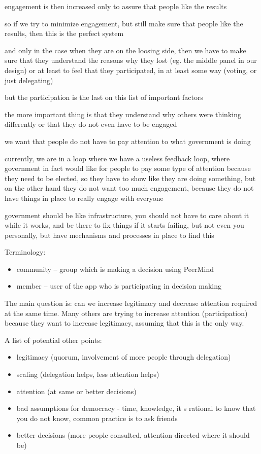\documentclass{sigchi}
\begin{document}
engagement is then increased only to assure that people like the results

so if we try to minimize engagement, but still make sure that people like the results, then this is the perfect system

and only in the case when they are on the loosing side, then we have to make sure that they understand the reasons why
they lost (eg. the middle panel in our design) or at least to feel that they participated, in at least some way
(voting, or just delegating)

but the participation is the last on this list of important factors

the more important thing is that they understand why others were thinking differently
or that they do not even have to be engaged

we want that people do not have to pay attention to what government is doing

currently, we are in a loop where we have a useless feedback loop, where government in fact would like for people
to pay some type of attention because they need to be elected, so they have to show like they are doing something,
but on the other hand they do not want too much engagement, because they do not have things in place to really
engage with everyone

government should be like infrastructure, you should not have to care about it while it works, and be there to fix
things if it starts failing, but not even you personally, but have mechanisms and processes in place to find this

Terminology:
\begin{itemize}
\item community -- group which is making a decision using PeerMind
\item member -- user of the app who is participating in decision making
\end{itemize}


The main question is: can we increase legitimacy and decrease attention required at the same time.
Many others are trying to increase attention (participation) because they want to increase legitimacy,
assuming that this is the only way.

A list of potential other points:
\begin{itemize}
\item legitimacy (quorum, involvement of more people through delegation)
\item scaling (delegation helps, less attention helps)
\item attention (at same or better decisions)
\item bad assumptions for democracy - time, knowledge, it s rational to know that you do not know, common practice is to ask friends
\item better decisions (more people consulted, attention directed where it should be)
\end{itemize}
\end{document}
